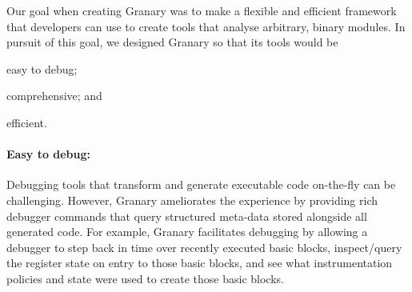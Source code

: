 \documentclass{sigplanconf}
\begin{document}
Our goal when creating Granary was to make a flexible and efficient framework that developers can use to create tools that analyse arbitrary, binary modules. In pursuit of this goal, we designed Granary so that its tools would be \begin{inparaenum}[i)]
	\item easy to debug;
	\item comprehensive; and
	\item efficient.
\end{inparaenum}





\paragraph{Easy to debug:} Debugging tools that transform and generate executable code on-the-fly can be challenging. However, Granary ameliorates the experience by providing rich debugger commands that query structured meta-data stored alongside all generated code. For example, Granary facilitates debugging by allowing a debugger to step back in time over recently executed basic blocks, inspect/query the register state on entry to those basic blocks, and see what instrumentation policies and state were used to create those basic blocks.
\end{document}
